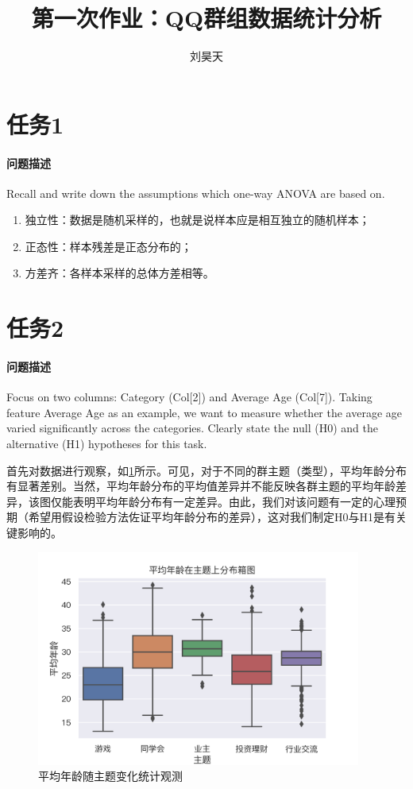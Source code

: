 \documentclass[a4paper,12pt]{article}
\title{第一次作业：QQ群组数据统计分析}
\author{刘昊天}
\begin{document}
    \maketitle
    \section{任务1} %
    \paragraph{问题描述} %
    Recall and write down the assumptions which one-way ANOVA are based on.

    \begin{enumerate}
        \item 独立性：数据是随机采样的，也就是说样本应是相互独立的随机样本；
        \item 正态性：样本残差是正态分布的；
        \item 方差齐：各样本采样的总体方差相等。
    \end{enumerate}
    \section{任务2} %
    \paragraph{问题描述} Focus on two columns: Category (Col[2]) and Average Age (Col[7]). Taking feature Average Age as an example, we want to measure whether the average age varied significantly across the categories. Clearly state the null (H0) and the alternative (H1) hypotheses for this task.

    首先对数据进行观察，如\cref{fig:task2-boxplot}所示。可见，对于不同的群主题（类型），平均年龄分布有显著差别。当然，平均年龄分布的平均值差异并不能反映各群主题的平均年龄差异，该图仅能表明平均年龄分布有一定差异。由此，我们对该问题有一定的心理预期（希望用假设检验方法佐证平均年龄分布的差异），这对我们制定H0与H1是有关键影响的。
    \begin{figure}[htbp]
        \centering
        \includegraphics[width=0.95\textwidth]{task2-boxplot}
        \caption{平均年龄随主题变化统计观测}
        \label{fig:task2-boxplot}
    \end{figure}
\end{document}
